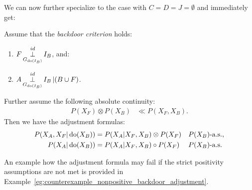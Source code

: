 We can now further specialize to the case with $C=D=J= \emptyset$ and immediately get:

\begin{Cor}
    \label{cor:backdoor_adjustment}
    Assume that the \emph{backdoor criterion} holds:
\begin{enumerate}
    \item $\displaystyle F \operatorname*{\perp}^{id}_{G_{\operatorname{do}(I_B)}} I_B$, and:
    \item $\displaystyle A \operatorname*{\perp}^{id}_{G_{\operatorname{do}(I_B)}} I_B  \operatorname*{|} (B \cup F)$.
\end{enumerate}
    Further assume the following absolute continuity:
  \begin{align*}
      P(X_F) \otimes P(X_B) &\ll  P(X_F,X_B).
  \end{align*}
Then we have the adjustment formulas: 
\begin{align*} 
    P(X_A,X_F|\operatorname{do}(X_B)) &= P(X_A|X_F,X_B) \otimes P(X_F)  && P(X_B)\text{-a.s.}, \\
    P(X_A|\operatorname{do}(X_B)) &= P(X_A|X_F,X_B) \circ P(X_F)   && P(X_B)\text{-a.s.}
\end{align*}
\end{Cor}

\begin{Rem}
An example how the adjustment formula may fail if the strict positivity assumptions are not met is provided in Example~\ref{eg:counterexample_nonpositive_backdoor_adjustment}.
\end{Rem}
